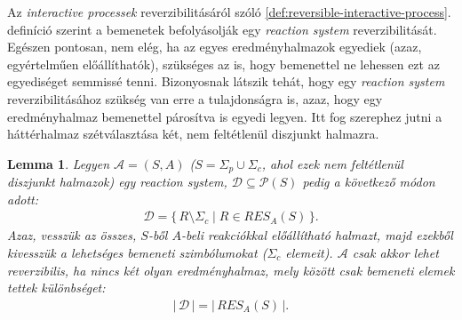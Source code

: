 \documentclass[12pt]{article}
\theoremstyle{definition}
\theoremstyle{remark}
\theoremstyle{plain}
\theoremstyle{remark}
\theoremstyle{plain}
\newtheorem{lemma}{Lemma}
\begin{document}
    Az \textit{interactive processek} reverzibilitásáról szóló \ref{def:reversible-interactive-process}. definíció szerint a bemenetek befolyásolják egy \textit{reaction system} reverzibilitását. Egészen pontosan, nem elég, ha az egyes eredményhalmazok egyediek (azaz, egyértelműen előállíthatók), szükséges az is, hogy bemenettel ne lehessen ezt az egyediséget semmissé tenni. Bizonyosnak látszik tehát, hogy egy \textit{reaction system} reverzibilitásához szükség van erre a tulajdonságra is, azaz, hogy egy eredményhalmaz bemenettel párosítva is egyedi legyen. Itt fog szerephez jutni a háttérhalmaz szétválasztása két, nem feltétlenül diszjunkt halmazra.

    \begin{lemma}\label{lem:unique-results}
        Legyen $\mathscr{A} = (S, A)$ ($S = \Sigma_{p} \cup \Sigma_{c}$, ahol ezek nem feltétlenül diszjunkt halmazok) egy \textit{reaction system}, $\mathcal{D} \subseteq \mathcal{P}(S)$ pedig a következő módon adott:
        \begin{align*}
            \mathcal{D} = \{ \, R \setminus \Sigma_{c} \mid R \in \textit{RES}_{A}(S) \, \}.
        \end{align*}
        Azaz, vesszük az összes, $S$-ből $A$-beli reakciókkal előállítható halmazt, majd ezekből kivesszük a lehetséges bemeneti szimbólumokat ($\Sigma_{c}$ elemeit).
        $\mathscr{A}$ csak akkor lehet reverzibilis, ha nincs két olyan eredményhalmaz, mely között csak bemeneti elemek tettek különbséget:
        \begin{align*}
            |\,\mathcal{D}\,| = |\,\textit{RES}_{A}(S)\,|.
        \end{align*}
    \end{lemma}
\end{document}

